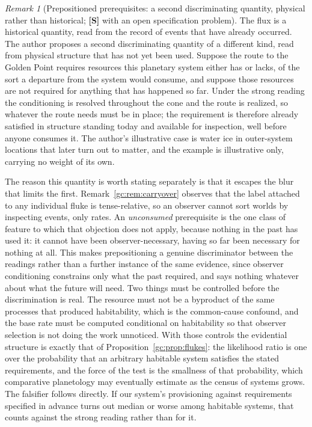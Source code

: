 \documentclass[11pt]{article}
\numberwithin{equation}{section}
\theoremstyle{plain}
\theoremstyle{definition}
\theoremstyle{remark}
\newtheorem{remark}[theorem]{Remark}
\begin{document}
\begin{remark}[Prepositioned prerequisites: a second discriminating
quantity, physical rather than historical; \textbf{[S]} with an open specification problem]
\label{rw:rem:preposition}
The flux is a historical quantity, read from the record of events
that have already occurred. The author proposes a second
discriminating quantity of a different kind, read from physical
structure that has not yet been used. Suppose the route to the
Golden Point requires resources this planetary system either has or
lacks, of the sort a departure from the system would consume, and
suppose those resources are not required for anything that has
happened so far. Under the strong reading the conditioning is
resolved throughout the cone and the route is realized, so whatever
the route needs must be in place; the requirement is therefore
already satisfied in structure standing today and available for
inspection, well before anyone consumes it. The author's
illustrative case is water ice in outer-system locations that later
turn out to matter, and the example is illustrative only, carrying
no weight of its own.

The reason this quantity is worth stating separately is that it
escapes the blur that limits the first. Remark~\ref{gc:rem:carryover}
observes that the label attached to any individual fluke is
tense-relative, so an observer cannot sort worlds by inspecting
events, only rates. An \emph{unconsumed} prerequisite is the one
class of feature to which that objection does not apply, because
nothing in the past has used it: it cannot have been
observer-necessary, having so far been necessary for nothing at all.
This makes prepositioning a genuine discriminator between the
readings rather than a further instance of the same evidence, since
observer conditioning constrains only what the past required, and
says nothing whatever about what the future will need. Two things
must be controlled before the discrimination is real. The resource
must not be a byproduct of the same processes that produced
habitability, which is the common-cause confound, and the base rate
must be computed conditional on habitability so that observer
selection is not doing the work unnoticed. With those controls the
evidential structure is exactly that of
Proposition~\ref{gc:prop:flukes}: the likelihood ratio is one over
the probability that an arbitrary habitable system satisfies the
stated requirements, and the force of the test is the smallness of
that probability, which comparative planetology may eventually
estimate as the census of systems grows. The falsifier follows
directly. If our system's provisioning against requirements
specified in advance turns out median or worse among habitable
systems, that counts against the strong reading rather than for it.


\end{remark}
\end{document}
